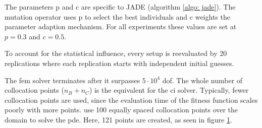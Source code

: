 \documentclass[./\jobname.tex]{subfiles}
\begin{document}
The parameters p and c are specific to JADE (algorithm \ref{algo: jade}). The mutation operator  uses p to select the best individuals and c weights the parameter adaption mechanism. For all experiments these values are set at $p=0.3$ and $c=0.5$. 

To account for the statistical influence, every setup is reevaluated by 20 replications where each replication starts with independent initial guesses. 

The \gls{fem} solver terminates after it surpasses $5 \cdot 10^4$ \gls{dof}. The whole number of collocation points ($n_B + n_C$) is the equivalent for the \gls{ci} solver. Typically, fewer collocation points are used, since the evaluation time of the fitness function scales poorly with more points. \cite{chaquet_using_2019} use 100 equally spaced collocation points over the domain to solve the \gls{pde}. Here, 121 points are created, as seen in figure \ref{fig:collocation_points}. 


\begin{figure}[h]
	\centering
	\noindent{}
	\label{fig:collocation_points}
\end{figure}
\end{document}
